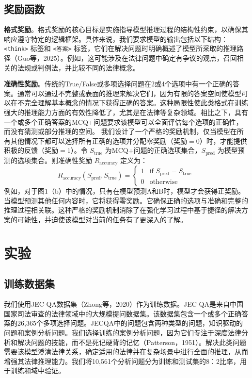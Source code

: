 \documentclass{pkuthesis}
\begin{document}
\subsection{奖励函数}
\textbf{格式奖励}。格式奖励的核心目标是实施指导模型推理过程的结构性约束，以确保其响应遵守特定的逻辑框架。具体来说，我们要求模型的输出包括以下结构：\texttt{<think>} 标签和 \texttt{<答案>} 标签，它们在解决问题时明确概述了模型所采取的推理路径（Guo等，2025）。例如，这可能涉及在法律问题中确定有争议的观点，召回相关的法规或判例法，并比较不同的法律概念。

\textbf{准确性奖励}。传统的True/False或多项选择问题在2或4个选项中有一个正确的答案。通常可以通过不完整或表面的推理来解决它们，因为有限的答案空间使模型可以在不完全理解基本概念的情况下获得正确的答案。这种局限性使此类格式在训练强大的推理能力方面的有效性降低了，尤其是在法律等复杂领域。相比之下，具有一个或多个正确答案的MCQ+问题要求该模型可以全面评估每个选项的正确性，而没有猜测或部分推理的空间。
我们设计了一个严格的奖励机制，仅当模型在所有其他情况下都可以选择所有正确的选项并分配零奖励（奖励$=0$）时，才能提供积极的反馈（奖励$=1$）。令 $S_{\text{true}}$ 为MCQ+问题的正确选项集合，$S_{\text{pred}}$ 为模型预测的选项集合。则准确性奖励 $R_{\text{accuracy}}$ 定义为：
$$ R_{\text{accuracy}}(S_{\text{pred}}, S_{\text{true}}) = \begin{cases} 1 & \text{if } S_{\text{pred}} = S_{\text{true}} \\ 0 & \text{otherwise} \end{cases} $$
例如，对于图1（b）中的情况，只有在模型预测A和B时，模型才会获得正奖励。当模型预测其他任何内容时，它将获得零奖励。它确保正确的选项与准确和完整的推理过程相关联。这种严格的奖励机制消除了在强化学习过程中基于捷径的解决方案的可能性，并迫使该模型对当前的任务有了更深入的了解。

\section{实验}
\subsection{训练数据集}
我们使用JEC-QA数据集（Zhong等，2020）作为训练数据。JEC-QA是来自中国国家司法审查的法律领域中的大规模提问数据集。该数据集包含一个或多个正确答案的26,365个多项选择问题。JECQA中的问题包含两种类型的问题，知识驱动的问题和案例分析问题。我们选择训练的案例分析问题，因为它们专注于深度法律分析和解决问题的技能，而不是死记硬背的记忆（Patterson，1951）。解决此类问题需要该模型澄清法律关系，确定适用的法律并在复杂场景中进行全面的推理，从而增强其法律推理能力。我们将10,561个分析问题分为训练和测试集的8：2比率，用于训练和域中验证。
\end{document}
